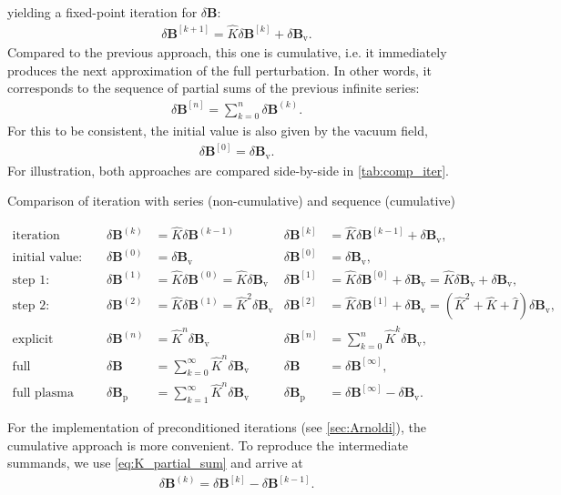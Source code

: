 \documentclass[a4paper, twoside, 10pt, english]{article}
\numberwithin{equation}{section}
\let\vec\symbf
\newcommand*\Bvac{\ensuremath{\delta \vec{B}_{\text{v}}}}  %
\newcommand*\Bplas{\ensuremath{\delta \vec{B}_{\text{p}}}}  %
\newcommand*\Bpert{\ensuremath{\delta \vec{B}}}  %
\begin{document}
yielding a fixed-point iteration for $\Bpert$:
\begin{gather}
  \Bpert^{[k+1]} = \hat{K} \Bpert^{[k]} + \Bvac.
\end{gather}
Compared to the previous approach, this one is cumulative, i.e. it immediately produces the next approximation of the full perturbation. In other words, it corresponds to the sequence of partial sums of the previous infinite series:
\begin{gather}
  \Bpert^{[n]} = \sum_{k = 0}^{n} \Bpert^{(k)}. \label{eq:K_partial_sum}
\end{gather}
For this to be consistent, the initial value is also given by the vacuum field,
\begin{gather}
  \Bpert^{[0]} = \Bvac.
\end{gather}
For illustration, both approaches are compared side-by-side in \cref{tab:comp_iter}.
\begin{table}[bth]
  \caption{Comparison of iteration with series (non-cumulative) and sequence (cumulative)}
  \label{tab:comp_iter}
  \begin{align*}
    \text{iteration step:} && \Bpert^{(k)} &= \hat{K} \Bpert^{(k-1)} & \Bpert^{[k]} &= \hat{K} \Bpert^{[k-1]} + \Bvac, \\
    \text{initial value:} && \Bpert^{(0)} &= \Bvac & \Bpert^{[0]} &= \Bvac, \\
    \text{step 1:} && \Bpert^{(1)} &= \hat{K} \Bpert^{(0)} = \hat{K} \Bvac & \Bpert^{[1]} &= \hat{K} \Bpert^{[0]} + \Bvac = \hat{K} \Bvac + \Bvac, \\
    \text{step 2:} && \Bpert^{(2)} &= \hat{K} \Bpert^{(1)} = \hat{K}^{2} \Bvac & \Bpert^{[2]} &= \hat{K} \Bpert^{[1]} + \Bvac = \left ( \hat{K}^{2} + \hat{K} + \hat{I} \right ) \Bvac, \\
    \text{explicit form:} && \Bpert^{(n)} &= \hat{K}^{n} \Bvac & \Bpert^{[n]} &= \sum_{k = 0}^{n} \hat{K}^{k} \Bvac, \\
    \text{full perturbation:} && \Bpert &= \sum_{k = 0}^{\infty} \hat{K}^{n} \Bvac & \Bpert &= \Bpert^{[\infty]}, \\
    \text{full plasma response:} && \Bplas &= \sum_{k = 1}^{\infty} \hat{K}^{n} \Bvac & \Bplas &= \Bpert^{[\infty]} - \Bvac.
  \end{align*}
\end{table}
For the implementation of preconditioned iterations (see \cref{sec:Arnoldi}), the cumulative approach is more convenient. To reproduce the intermediate summands, we use \cref{eq:K_partial_sum} and arrive at
\begin{gather}
  \Bpert^{(k)} = \Bpert^{[k]} - \Bpert^{[k-1]}.
\end{gather}
\end{document}
